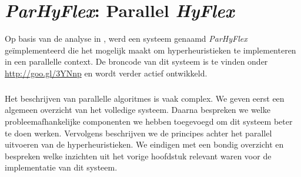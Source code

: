 \chapter{\emph{ParHyFlex}: Parallel \emph{HyFlex}}


Op basis van de analyse in , werd een systeem genaamd \emph{ParHyFlex} ge\"implementeerd die het mogelijk maakt om hyperheuristieken te implementeren in een parallelle context. De broncode van dit systeem is te vinden onder \mbox{\url{http://goo.gl/3YNnp}} en wordt verder actief ontwikkeld.
\paragraph{}
Het beschrijven van parallelle algoritmes is vaak complex. We geven eerst een algemeen overzicht van het volledige systeem. Daarna bespreken we welke probleemafhankelijke componenten we hebben toegevoegd om dit systeem beter te doen werken. Vervolgens beschrijven we de principes achter het parallel uitvoeren van de hyperheuristieken. We eindigen met een bondig overzicht en bespreken welke inzichten uit het vorige hoofdstuk relevant waren voor de implementatie van dit systeem.



